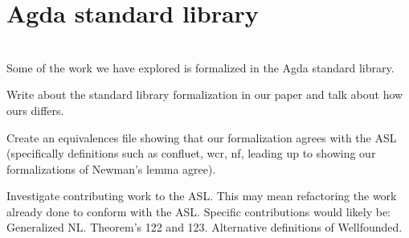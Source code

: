 \documentclass{article}
\begin{document}
\section*{Agda standard library}
\\ Some of the work we have explored is formalized in the Agda standard library.  
\begin{todolist}
  \item Write about the standard library formalization in our paper and talk about how ours differs. 
  \item Create an equivalences file showing that our formalization agrees with the ASL (specifically definitions such as confluet, wcr, nf, leading up to showing our formalizations of Newman's lemma agree).
  \item Investigate contributing work to the ASL. This may mean refactoring the work already done to conform with the ASL. Specific contributions would likely be: Generalized NL. Theorem's 122 and 123. Alternative definitions of Wellfounded. 
\end{todolist}
\end{document}
